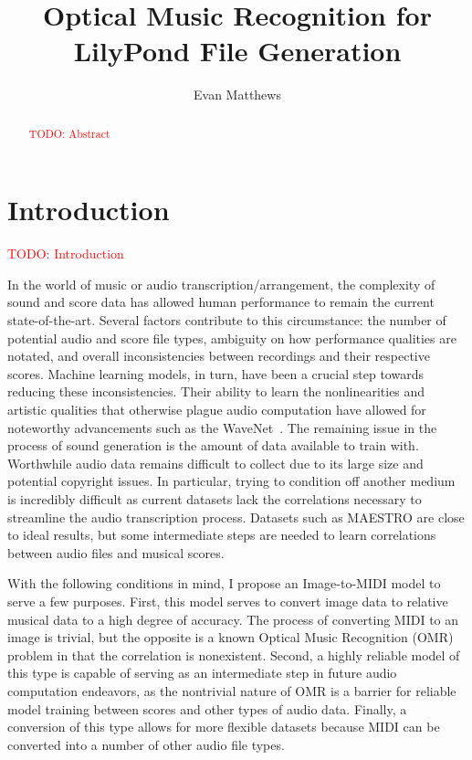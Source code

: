 \documentclass[review,sigconf]{acmart}
\newcommand{\todo}[1]{\textcolor{red}{TODO: #1}}
\begin{document}
\title[omr-lilypond-midi]{Optical Music Recognition for LilyPond File Generation}
\author{Evan Matthews}

\begin{abstract}
\todo{Abstract}
\end{abstract}

\maketitle

\section{Introduction}
\todo{Introduction}
\cite{oord2016wavenet,contreras2023omrcnn,contreras2023omrpiano,mayer2024practical,andrea2021note}

In the world of music or audio transcription/arrangement, the complexity of sound and score data has allowed human performance to remain the current state-of-the-art. Several factors contribute to this circumstance: the number of potential audio and score file types, ambiguity on how performance qualities are notated, and overall inconsistencies between recordings and their respective scores. Machine learning models, in turn, have been a crucial step towards reducing these inconsistencies. Their ability to learn the nonlinearities and artistic qualities that otherwise plague audio computation have allowed for noteworthy advancements such as the WaveNet~\cite{oord2016wavenet}. The remaining issue in the process of sound generation is the amount of data available to train with. Worthwhile audio data remains difficult to collect due to its large size and potential copyright issues. In particular, trying to condition off another medium is incredibly difficult as current datasets lack the correlations necessary to streamline the audio transcription process. Datasets such as MAESTRO are close to ideal results, but some intermediate steps are needed to learn correlations between audio files and musical scores.

With the following conditions in mind, I propose an Image-to-MIDI model to serve a few purposes. First, this model serves to convert image data to relative musical data to a high degree of accuracy. The process of converting MIDI to an image is trivial, but the opposite is a known Optical Music Recognition (OMR) problem in that the correlation is nonexistent. 
Second, a highly reliable model of this type is capable of serving as an intermediate step in future audio computation endeavors, as the nontrivial nature of OMR is a barrier for reliable model training between scores and other types of audio data. 
Finally, a conversion of this type allows for more flexible datasets because MIDI can be converted into a number of other audio file types.
\end{document}
